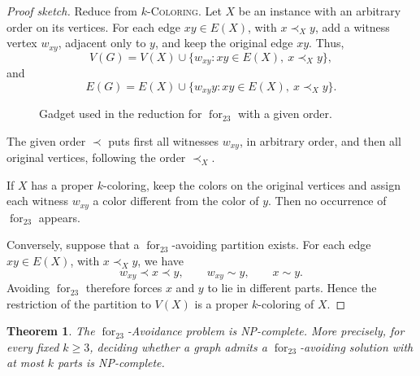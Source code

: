 \documentclass[12pt]{article}
\theoremstyle{plain}
\newtheorem{theorem}{Theorem}[section]
\theoremstyle{definition}
\theoremstyle{remark}
\theoremstyle{definition}
\newcommand{\forlabel}{\mathrm{for}}
\DeclareRobustCommand{\forparam}[1]{%
  \ensuremath{\mathop{\forlabel}\nolimits_{#1}}%
}
\newcommand{\forst}{\forparam{23}}
\begin{document}
\begin{proof}[Proof sketch]
Reduce from \(k\)-\textsc{Coloring}. Let \(X\) be an instance with an arbitrary order on its vertices.
For each edge \(xy\in E(X)\), with \(x\prec_X y\), add a witness vertex \(w_{xy}\), adjacent only to \(y\), and keep
the original edge \(xy\). Thus,
\[
V(G)=V(X)\cup \{w_{xy}: xy\in E(X),\ x\prec_X y\},
\]
and
\[
E(G)=E(X)\cup \{w_{xy}y: xy\in E(X),\ x\prec_X y\}.
\]


\begin{figure}[h]
\centering
{}
\caption{Gadget used in the reduction for \(\forst\) with a given order.}
\label{fig:forst-given-order-gadget}
\end{figure}


The given order \(\prec\) puts first all witnesses \(w_{xy}\), in arbitrary order, and then all original vertices,
following the order \(\prec_X\).

If \(X\) has a proper \(k\)-coloring, keep the colors on the original vertices and assign each witness \(w_{xy}\)
a color different from the color of \(y\). Then no occurrence of \(\forst\) appears.

Conversely, suppose that a \(\forst\)-avoiding partition exists. For each edge \(xy\in E(X)\), with \(x\prec_X y\),
we have
\[
w_{xy}\prec x\prec y,
\qquad
w_{xy}\sim y,
\qquad
x\sim y.
\]
Avoiding \(\forst\) therefore forces \(x\) and \(y\) to lie in different parts. Hence the restriction of the
partition to \(V(X)\) is a proper \(k\)-coloring of \(X\).
\end{proof}





\begin{theorem}\label{thm:forst-general-np-complete}
The \(\forst\)-Avoidance problem is NP-complete.
More precisely, for every fixed \(k\ge 3\), deciding whether a graph admits a
\(\forst\)-avoiding solution with at most \(k\) parts is NP-complete.
\end{theorem}
\end{document}
